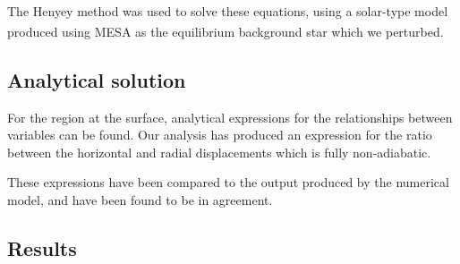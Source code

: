 \documentclass[a0,portrait]{a0poster}
\begin{document}
\begin{multicols}{2}
\begin{tcolorbox}[colframe=black,colback=blue!10!white]
The Henyey method \textsuperscript{\cite{Henyey1964}} was used to solve these equations, using a solar-type model produced using MESA \textsuperscript{\cite{Paxton2011}} as the equilibrium background star which we perturbed.


\subsection*{Analytical solution}

For the region at the surface, analytical expressions for the relationships between variables can be found.  Our analysis has produced an expression for the ratio between the horizontal and radial displacements which is fully non-adiabatic.

These expressions have been compared to the output produced by the numerical model, and have been found to be in agreement.

\vspace{0.5cm}

\end{tcolorbox}




\begin{tcolorbox}[colframe=black,colback=blue!10!white]
\small
\normalsize

\end{tcolorbox}




\begin{tcolorbox}[colframe=black,colback=blue!10!white]

\vspace{0.5cm}

\section*{Results}


\end{tcolorbox}
\end{multicols}
\end{document}
